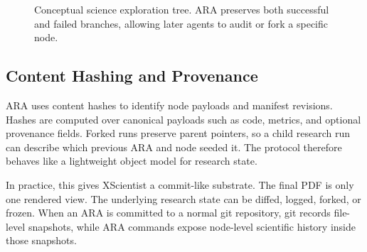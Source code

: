 \documentclass[11pt]{article}
\begin{document}
\begin{figure}[t]
\centering
{}
\caption{Conceptual science exploration tree. ARA preserves both successful
and failed branches, allowing later agents to audit or fork a specific node.}
\label{fig:tree}
\end{figure}

\subsection{Content Hashing and Provenance}

ARA uses content hashes to identify node payloads and manifest revisions.
Hashes are computed over canonical payloads such as code, metrics, and
optional provenance fields. Forked runs preserve parent pointers, so a child
research run can describe which previous ARA and node seeded it. The protocol
therefore behaves like a lightweight object model for research state.

In practice, this gives XScientist a commit-like substrate. The final PDF is
only one rendered view. The underlying research state can be diffed, logged,
forked, or frozen. When an ARA is committed to a normal git repository, git
records file-level snapshots, while ARA commands expose node-level scientific
history inside those snapshots.
\end{document}
